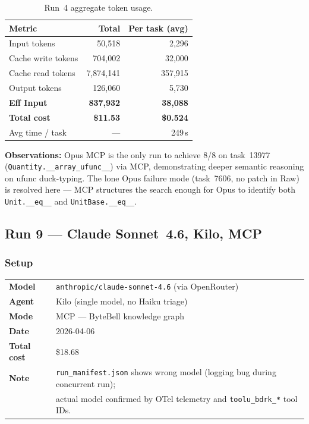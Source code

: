 \begin{table}[h]
\centering
\caption{Run~4 aggregate token usage.}\label{tab:r4-tokens}
\begin{tabular}{lrr}
\toprule
\textbf{Metric} & \textbf{Total} & \textbf{Per task (avg)} \\
\midrule
Input tokens         & 50,518     & 2,296  \\
Cache write tokens   & 704,002    & 32,000 \\
Cache read tokens    & 7,874,141  & 357,915 \\
Output tokens        & 126,060    & 5,730  \\
\midrule
\textbf{Eff Input}   & \textbf{837,932} & \textbf{38,088} \\
\textbf{Total cost}  & \textbf{\$11.53} & \textbf{\$0.524} \\
Avg time / task      & ---        & 249\,s \\
\bottomrule
\end{tabular}
\end{table}

\noindent
\textbf{Observations:} Opus MCP is the only run to achieve 8/8 on task~13977
(\texttt{Quantity.\_\_array\_ufunc\_\_}) via MCP, demonstrating deeper semantic
reasoning on ufunc duck-typing. The lone Opus failure mode (task~7606, no
patch in Raw) is resolved here --- MCP structures the search enough for Opus
to identify both \texttt{Unit.\_\_eq\_\_} and \texttt{UnitBase.\_\_eq\_\_}.

\subsection{Run 9 --- Claude Sonnet~4.6, Kilo, MCP}
\label{sec:run9}

\subsubsection{Setup}

\begin{tabular}{ll}
\textbf{Model}     & \texttt{anthropic/claude-sonnet-4.6} (via OpenRouter) \\
\textbf{Agent}     & Kilo (single model, no Haiku triage) \\
\textbf{Mode}      & MCP --- ByteBell knowledge graph \\
\textbf{Date}      & 2026-04-06 \\
\textbf{Total cost} & \$18.68 \\
\textbf{Note}      & \texttt{run\_manifest.json} shows wrong model (logging bug during concurrent run); \\
                   & actual model confirmed by OTel telemetry and \texttt{toolu\_bdrk\_*} tool IDs. \\
\end{tabular}

